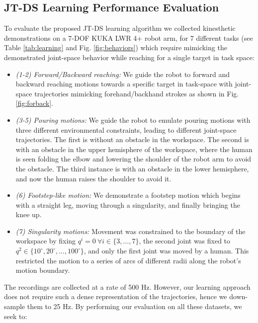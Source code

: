 \documentclass[letterpaper, 10 pt, conference,fleqn]{ieeeconf}
\begin{document}
\subsection{JT-DS Learning Performance  Evaluation}
To evaluate the proposed JT-DS learning algorithm we collected kinesthetic demonstrations on a 7-DOF KUKA LWR 4+ robot arm, for 7 different tasks (see Table \ref{tab:learning} and Fig. \ref{fig:behaviors}) which require mimicking the demonstrated joint-space behavior while reaching for a single target in task space:
\begin{itemize}[leftmargin=*]
\item \textit{(1-2) Forward/Backward reaching:} We guide the robot to  forward and backward reaching motions towards a specific target in task-space with joint-space trajectories mimicking forehand/backhand strokes as shown in Fig. \ref{fig:forback}.  
\item \textit{(3-5) Pouring motions:} We guide the robot to emulate pouring motions with three different environmental constraints, leading to different joint-space trajectories. The first is without an obstacle in the workspace. The second is with an obstacle in the upper hemisphere of the workspace, where the human is seen folding the elbow and lowering the shoulder of the robot arm to avoid the obstacle. The third instance is with an obstacle in the lower hemisphere, and now the human raises the shoulder to avoid it.
\item \textit{(6) Footstep-like motion:} We demonstrate a footstep motion which begins with a straight leg, moving through a singularity, and finally bringing the knee up.
\item \textit{(7) Singularity motions:} Movement was constrained to the boundary of the workspace by fixing $ q^i=0~\forall i\in\{3,\dots,7\}$, the second joint was fixed to $q^2\in\{10^\circ,20^\circ,\dots,100^\circ\}$, and only the first joint was moved by a human. This restricted the motion to a series of arcs of different radii along the robot's motion boundary.  
\end{itemize}

\noindent   The recordings are collected at a rate of 500 Hz. However, our learning approach does not require such a dense representation of the trajectories, hence we down-sample them to 25 Hz. By performing our evaluation on all these datasets, we seek to: 
\end{document}
